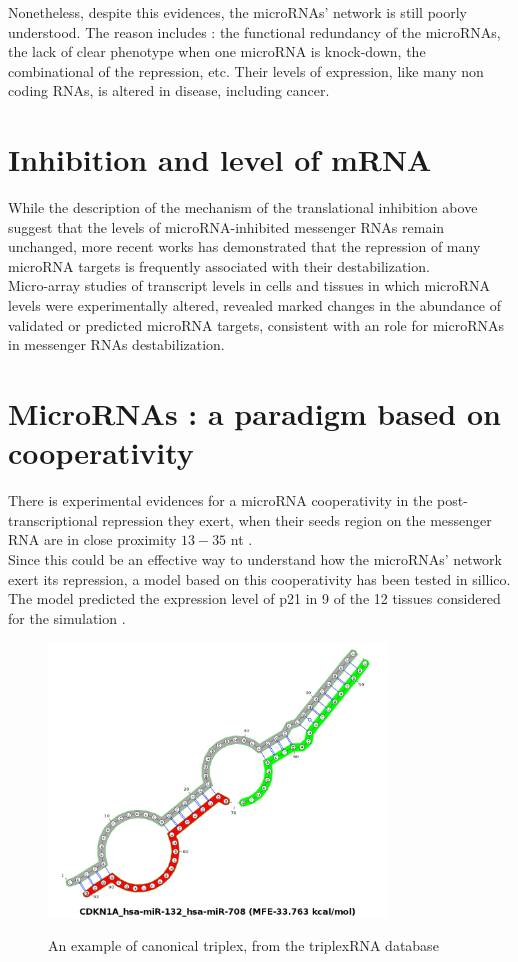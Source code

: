 \documentclass[a4paper,12pt]{report}
\begin{document}
Nonetheless, despite this evidences, the microRNAs' network is still poorly understood\cite{network,cancer}. The reason includes : the functional redundancy of the microRNAs, the lack of clear phenotype when one microRNA is knock-down, the combinational of the repression, etc\cite{network,cancer}. 
Their levels of expression, like many non coding RNAs, is altered in disease, including cancer\cite{cancer}.

\section{Inhibition and level of mRNA}

While the description of the mechanism of the translational inhibition above suggest that the levels of microRNA-inhibited messenger RNAs remain unchanged, more recent works has demonstrated that the repression of many microRNA targets is frequently associated with their destabilization\cite{cancer}.\\

Micro-array studies of transcript levels in cells and tissues
in which microRNA levels were experimentally altered, revealed marked changes in the abundance of validated or predicted microRNA targets, consistent with an role for microRNAs in messenger RNAs destabilization\cite{cancer}.

\section{MicroRNAs : a paradigm based on cooperativity}

There is experimental evidences for a microRNA cooperativity in the post-transcriptional repression they exert, when their seeds region on the messenger RNA are in close proximity $13\!- \!35$ nt \cite{site, coop}.\\

Since this could be an effective way to understand how the microRNAs' network exert its repression, a model based on this cooperativity has been tested in sillico. The model predicted the expression level of p21 in 9 of the 12 tissues considered for the simulation \cite{p21}.
\begin{figure}[H]
	\centering
	{\includegraphics[width=0.8\textwidth]{canonical.png}}
	\caption{An example of canonical triplex, from the triplexRNA database}
\end{figure}
\end{document}
